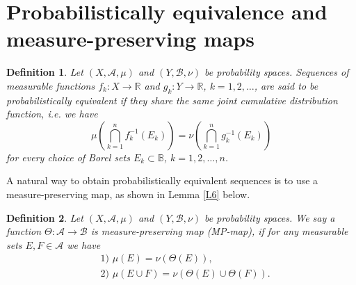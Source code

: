 \documentclass[12pt,reqno,fleqn]{amsart}
\theoremstyle{plain} %
\theoremstyle{remark}
\def\ZB{\ensuremath{\mathscr B}}
\def\zB{\ensuremath{\mathbb B}}
\def\ZA{\ensuremath{\mathscr A}}
\def\ZR{\ensuremath{\mathbb R}}
\theoremstyle{plain}
\newtheorem{definition}{Definition}[section]
\numberwithin{equation}{section}
\newcommand {\lem }[1]{Lemma \ref{#1}}
\begin{document}
\section{Probabilistically equivalence and measure-preserving maps}
\begin{definition}\label{D1}
	Let $(X,\ZA,\mu)$ and $(Y,\ZB,\nu)$ be probability spaces. Sequences of measurable functions $f_k:X\to \ZR$ and $g_k:Y\to \ZR$, $k=1,2,\ldots$, are said to be probabilistically equivalent if they share the same joint cumulative distribution function, i.e. we have
	\begin{equation}\label{b8}
		\mu\left(\bigcap_{k=1}^nf_k^{-1}(E_k)\right)=\nu\left(\bigcap_{k=1}^ng_k^{-1}(E_k)\right)
	\end{equation}
	for every choice of Borel sets $E_k\subset \zB$, $k=1,2,\ldots,n$. 
\end{definition}
A natural way to obtain probabilistically equivalent sequences is to use a measure-preserving map, as shown in \lem{L6} below.
\begin{definition}
	Let $(X,\ZA,\mu)$ and $(Y,\ZB,\nu)$ be probability spaces. We say a function $\Theta:\ZA \to \ZB$ is measure-preserving map (MP-map), if for any measurable sets $E,F\in \ZA$ we have
	\begin{align}
		&\text{1) }\mu(E)=\nu(\Theta(E)),\\
		&\text{2) }\mu(E\cup F)=\nu(\Theta(E)\cup \Theta(F)).\label{x43}
	\end{align}
\end{definition}
\end{document}
